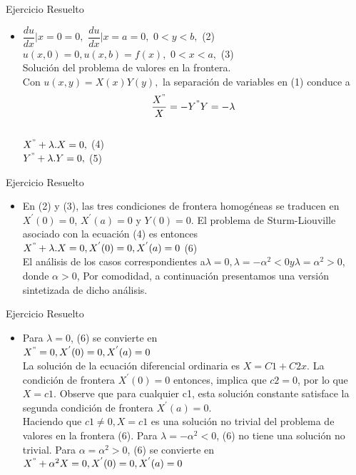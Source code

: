 \documentclass[11pt]{beamer}
\begin{document}
\begin{frame}{Ejercicio Resuelto\\
}

  \begin{itemize}
  \item
    $\dfrac{du}{dx}|x=0 =0, $ 
$ \dfrac{du}{dx}|x=a =0, $ $ 0<y<b,$ (2)\\
$u(x,0)=0 ,  u(x,b)=f(x), $ $0<x<a,$ (3)\\
Solución del problema de valores en la frontera.\\
Con $u(x,y)=X(x)Y(y),$ la separación de variables en (1) conduce a\\
$$\dfrac{X^{"}}{X}=-Y^{"}{Y}=-\lambda$$\\
$X^{"}+\lambda.X=0,$ (4) \\
$Y^{"}+\lambda.Y=0,$ (5)\\
    
  \end{itemize}
\end{frame}

\begin{frame}{Ejercicio Resuelto\\
}
  \begin{itemize}
  \item
    En (2) y (3), las tres condiciones de frontera homogéneas se traducen en $X^{'}(0)=0$, $X^{'}(a)=0$ y $Y(0)=0$. El problema de Sturm-Liouville asociado con la ecuación (4) es entonces\\
$X^{"}+\lambda.X=0, X^{'}(0)=0, X^{'}(a)=0$ (6)\\
El análisis de los casos correspondientes a$\lambda=0, \lambda=-\alpha^{2}<0 y \lambda=\alpha^{2}>0$, donde $\alpha>0$, Por comodidad, a continuación
presentamos una versión sintetizada de dicho análisis.
    
  \end{itemize}
\end{frame}

\begin{frame}{Ejercicio Resuelto\\
}
  \begin{itemize}
  \item
    Para $\lambda=0$, (6) se convierte en\\
$X^{"}=0,X^{'}(0)=0,X^{'}(a)=0$\\
La solución de la ecuación diferencial ordinaria es $X=C1+C2x$. La condición de frontera
$X^{'}(0)=0$ entonces, implica que $c2=0$, por lo que $X=c1$. Observe que para cualquier
c1, esta solución constante satisface la segunda condición de frontera $X^{'}(a)=0$.\\
Haciendo que $c1\neq 0, X=c1 $ es una solución no trivial del problema de valores en la
frontera (6). Para $\lambda=-\alpha^{2}<0$, (6) no tiene una solución no trivial. Para $\alpha=\alpha^{2}>0$, (6)
se convierte en\\
$X^{"}+\alpha^{2}X=0,X^{'}(0)=0,X^{'}(a)=0$\\
    
  \end{itemize}
\end{frame}
\end{document}
